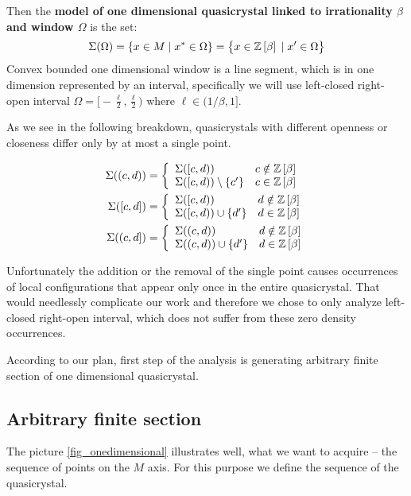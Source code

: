 \documentclass[text.tex]{subfiles}
\begin{document}
Then the \textbf{model of one dimensional quasicrystal linked to irrationality $\beta$ and window $\Omega$} is the set:
$$\Sigma(\Omega) = \{ x \in M\; |\; x^\ast\in \Omega\} = \big\{ x \in \mathbb{Z}\left[\beta\right]\; |\; x'\in \Omega\big\}$$
Convex bounded one dimensional window is a line segment, which is in one dimension represented by an interval, specifically we will use left-closed right-open interval $\Omega = \big[-\frac{\ell}{2}, \frac{\ell}{2}\big)$ where $\ell\in (1/\beta,1]$. 

As we see in the following breakdown, quasicrystals with different openness or closeness differ only by at most a single point. 

\begin{align*}
\Sigma((c,d)) &= \left\{ 
	\begin{array}{l l}
	\Sigma([c,d)) & c \notin \mathbb{Z}\left[\beta\right]\\
	\Sigma([c,d))\setminus\{c'\} & c \in \mathbb{Z}\left[\beta\right]
	\end{array} \right. 
  \\
  \Sigma([c,d]) &= \left\{ 
	\begin{array}{l l}
	\Sigma([c,d)) & d \notin \mathbb{Z}\left[\beta\right]\\
	\Sigma([c,d))\cup\{d'\} & d \in \mathbb{Z}\left[\beta\right]
	\end{array} \right.
  \\
\Sigma((c,d]) &= \left\{ 
	\begin{array}{l l}
	\Sigma((c,d)) & d \notin \mathbb{Z}\left[\beta\right]\\
	\Sigma((c,d))\cup\{d'\} & d \in \mathbb{Z}\left[\beta\right]
	\end{array} \right.\\
\end{align*}

Unfortunately the addition or the removal of the single point causes occurrences of local configurations that appear only once in the entire quasicrystal. That would needlessly complicate our work and therefore we chose to only analyze left-closed right-open interval, which does not suffer from these zero density occurrences. 

According to our plan, first step of the analysis is generating arbitrary finite section of one dimensional quasicrystal. 

\subsection{Arbitrary finite section}
The picture \ref{fig_onedimensional} illustrates well, what we want to acquire -- the sequence of points on the $M$ axis. For this purpose we define the sequence of the quasicrystal. 
\end{document}
